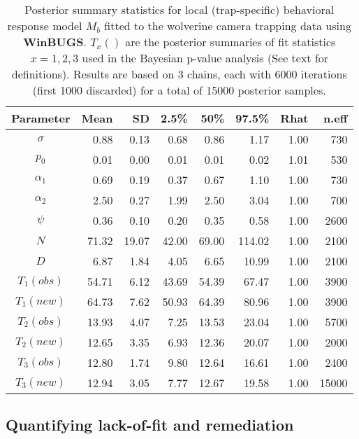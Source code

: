 \begin{table}[ht]
\centering
\caption{
Posterior summary statistics for local (trap-specific) behavioral
response model $M_{b}$ fitted to the wolverine camera trapping data
using {\bf WinBUGS}. $T_{x}()$ are the posterior summaries of fit
statistics $x=1,2,3$ used in the Bayesian p-value analysis (See text for
definitions). Results are based on
 3 chains, each with 6000 iterations (first 1000 discarded) for a
 total of 15000 posterior samples. 
}
\begin{tabular}{crrrrrrr} \hline \hline 
Parameter   & Mean  & SD  & 2.5\% & 50\% & 97.5\% & Rhat &n.eff \\ \hline
$\sigma$    &  0.88 & 0.13 & 0.68 & 0.86 & 1.17  &1.00  & 730 \\
$p_0$        &  0.01 & 0.00 & 0.01 & 0.01 & 0.02  &1.01  & 530\\
$\alpha_1$   &  0.69 & 0.19 & 0.37 & 0.67 &  1.10 &1.00  & 730\\
$\alpha_2$   &  2.50 & 0.27 & 1.99 & 2.50 &  3.04 &1.00  & 700\\
$\psi$       &  0.36 & 0.10 & 0.20 & 0.35 & 0.58  &1.00  &2600  \\
$N$          & 71.32 &19.07 &42.00 &69.00 &114.02 &1.00  &2100 \\
$D$          &  6.87 & 1.84 & 4.05 & 6.65 & 10.99 &1.00  &2100\\ \hline
$T_{1}(obs)$  & 54.71 & 6.12 &43.69 &54.39 & 67.47 &1.00  &3900\\
$T_{1}(new)$  & 64.73 & 7.62 &50.93 &64.39 & 80.96 &1.00  &3900\\
$T_{2}(obs)$  & 13.93 & 4.07 & 7.25 &13.53 & 23.04 &1.00  &5700\\
$T_{2}(new)$  & 12.65 & 3.35 & 6.93 &12.36 & 20.07 &1.00  &2000\\
$T_{3}(obs)$  & 12.80 & 1.74 & 9.80 &12.64 & 16.61 &1.00  &2400\\
$T_{3}(new)$  & 12.94 & 3.05 & 7.77 &12.67 & 19.58 &1.00 &15000\\ \hline
\end{tabular}
\label{gof.tab.wolvMb}
\end{table}

\subsection{Quantifying lack-of-fit and remediation}

